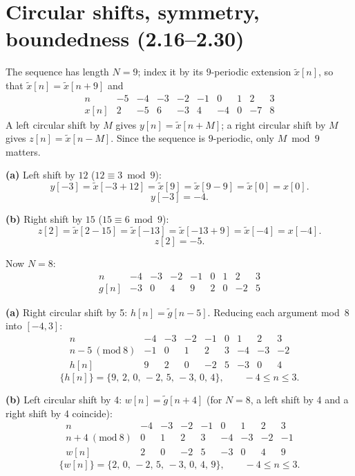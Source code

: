 \section{Circular shifts, symmetry, boundedness (2.16--2.30)}


The sequence has length $N=9$; index it by its $9$-periodic extension $\tilde{x}[n]$, so that
$\tilde{x}[n]=\tilde{x}[n+9]$ and
\[
\begin{array}{r|rrrrrrrrr}
n & -5 & -4 & -3 & -2 & -1 & 0 & 1 & 2 & 3\\\hline
x[n] & 2 & -5 & 6 & -3 & 4 & -4 & 0 & -7 & 8
\end{array}
\]
A left circular shift by $M$ gives $y[n]=\tilde{x}[n+M]$; a right circular shift by $M$ gives
$z[n]=\tilde{x}[n-M]$. Since the sequence is $9$-periodic, only $M\bmod 9$ matters.

\textbf{(a)} Left shift by $12$ ($12\equiv 3\bmod 9$):
\[
y[-3]=\tilde{x}[-3+12]=\tilde{x}[9]=\tilde{x}[9-9]=\tilde{x}[0]=x[0].
\]
\[
\boxed{\;y[-3]=-4.\;}
\]

\textbf{(b)} Right shift by $15$ ($15\equiv 6\bmod 9$):
\[
z[2]=\tilde{x}[2-15]=\tilde{x}[-13]=\tilde{x}[-13+9]=\tilde{x}[-4]=x[-4].
\]
\[
\boxed{\;z[2]=-5.\;}
\]


Now $N=8$:
\[
\begin{array}{r|rrrrrrrr}
n & -4 & -3 & -2 & -1 & 0 & 1 & 2 & 3\\\hline
g[n] & -3 & 0 & 4 & 9 & 2 & 0 & -2 & 5
\end{array}
\]

\textbf{(a)} Right circular shift by 5: $h[n]=\tilde{g}[n-5]$. Reducing each argument
mod~8 into $[-4,3]$:
\[
\begin{array}{r|rrrrrrrr}
n & -4 & -3 & -2 & -1 & 0 & 1 & 2 & 3\\
n-5 \ (\mathrm{mod}\ 8) & -1 & 0 & 1 & 2 & 3 & -4 & -3 & -2\\\hline
h[n] & 9 & 2 & 0 & -2 & 5 & -3 & 0 & 4
\end{array}
\]
\[
\boxed{\;\{h[n]\}=\{9,\,2,\,0,\,-2,\,5,\,-3,\,0,\,4\},\qquad -4\le n\le 3.\;}
\]

\textbf{(b)} Left circular shift by 4: $w[n]=\tilde{g}[n+4]$ (for $N=8$, a left shift by 4 and
a right shift by 4 coincide):
\[
\begin{array}{r|rrrrrrrr}
n & -4 & -3 & -2 & -1 & 0 & 1 & 2 & 3\\
n+4 \ (\mathrm{mod}\ 8) & 0 & 1 & 2 & 3 & -4 & -3 & -2 & -1\\\hline
w[n] & 2 & 0 & -2 & 5 & -3 & 0 & 4 & 9
\end{array}
\]
\[
\boxed{\;\{w[n]\}=\{2,\,0,\,-2,\,5,\,-3,\,0,\,4,\,9\},\qquad -4\le n\le 3.\;}
\]

